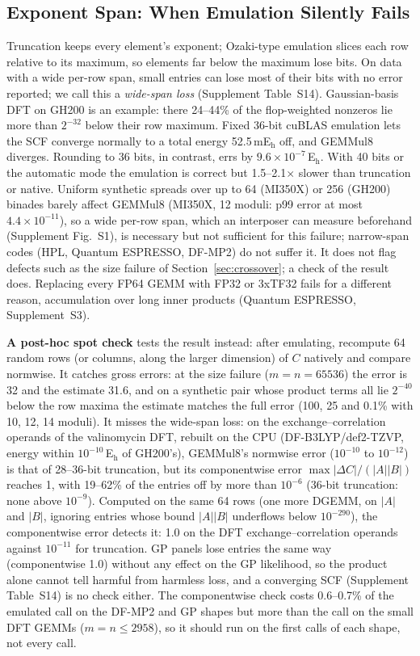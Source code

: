 \documentclass[conference]{IEEEtran}
\newcommand{\Eh}{\,E$_\mathrm{h}$}
\newcommand{\ee}[2]{#1{\times}10^{#2}}  %
\newcommand{\pct}{\%}
\begin{document}
\subsection{Exponent Span: When Emulation Silently Fails}\label{sec:span}

Truncation keeps every element's exponent; Ozaki-type emulation slices each row relative to its maximum, so elements far
below the maximum lose bits. On data with a wide per-row span, small entries can lose most of their bits with no error
reported; we call this a \emph{wide-span loss} (Supplement Table~S14). Gaussian-basis DFT on GH200 is an example: there
24--44\pct{} of the flop-weighted nonzeros lie more than $2^{-32}$ below their row maximum. Fixed 36-bit cuBLAS emulation
lets the SCF converge normally to a total energy 52.5\,mE$_\mathrm{h}$ off, and GEMMul8 diverges. Rounding to 36 bits,
in contrast, errs by $\ee{9.6}{-7}$\Eh. With 40 bits or the automatic mode the emulation is
correct but 1.5--2.1$\times$ slower than truncation or native. Uniform synthetic spreads over up to 64 (MI350X) or 256
(GH200) binades barely affect GEMMul8 (MI350X, 12 moduli: p99 error at most $\ee{4.4}{-11}$), so a wide per-row span,
which an interposer can measure beforehand (Supplement Fig.~S1), is necessary but not sufficient for this failure;
narrow-span codes (HPL, Quantum ESPRESSO, DF-MP2) do not suffer it. It does not flag defects such as the size
failure of Section~\ref{sec:crossover}; a check of the result does. Replacing every FP64 GEMM with FP32 or
3xTF32 fails for a different reason, accumulation over long inner products (Quantum ESPRESSO, Supplement~S3).

\textbf{A post-hoc spot check} tests the result instead: after emulating, recompute 64 random rows (or columns, along
the larger dimension) of $C$ natively and compare normwise. It catches gross errors: at the size failure ($m=n=65536$)
the error is 32 and the estimate 31.6, and on a synthetic pair whose product terms all lie $2^{-40}$ below the row
maxima the estimate matches the full error (100, 25 and 0.1\pct{} with 10, 12, 14 moduli). It misses the wide-span loss:
on the exchange--correlation operands of the valinomycin DFT, rebuilt on the CPU (DF-B3LYP/def2-TZVP, energy within
$10^{-10}$\Eh{} of GH200's), GEMMul8's normwise error ($10^{-10}$ to $10^{-12}$) is that of 28--36-bit truncation, but its
componentwise error $\max|\Delta C|/(|A||B|)$ reaches 1, with 19--62\pct{} of the entries off by more than $10^{-6}$
(36-bit truncation: none above $10^{-9}$). Computed on the same 64 rows (one more DGEMM, on $|A|$ and $|B|$, ignoring entries whose bound $|A||B|$ underflows below
$10^{-290}$), the componentwise error detects it: 1.0 on the DFT exchange--correlation operands against $10^{-11}$ for truncation. GP panels lose
entries the same way (componentwise 1.0) without any effect on the GP likelihood, so the product alone cannot tell harmful
from harmless loss, and a converging SCF (Supplement Table~S14) is no check either. The componentwise check costs
0.6--0.7\pct{} of the emulated call on the DF-MP2 and GP shapes but more than the call on the small DFT GEMMs
($m=n\le2958$), so it should run on the first calls of each shape, not every call.
\end{document}

